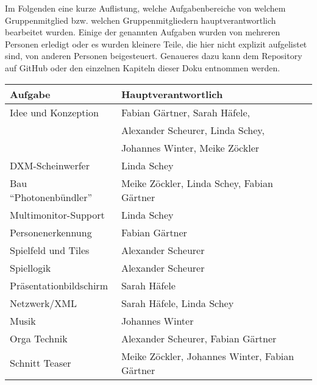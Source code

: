 
Im Folgenden eine kurze Auflistung, welche Aufgabenbereiche von welchem Gruppenmitglied bzw. welchen Gruppenmitgliedern hauptverantwortlich bearbeitet wurden. Einige der genannten Aufgaben wurden von mehreren Personen erledigt oder es wurden kleinere Teile, die hier nicht explizit aufgelistet sind, von anderen Personen beigesteuert. Genaueres dazu kann dem Repository auf GitHub oder den einzelnen Kapiteln dieser Doku entnommen werden.

\begin{center}
\begin{tabular}[hc]{|l|l|}
\hline
\textbf{Aufgabe} & \textbf{Hauptverantwortlich}\\
\hline
Idee und Konzeption& Fabian Gärtner, Sarah Häfele,\\
&Alexander Scheurer, Linda Schey,\\
&Johannes Winter, Meike Zöckler\\
DXM-Scheinwerfer&Linda Schey\\
Bau \enquote{Photonenbündler}&Meike Zöckler, Linda Schey, Fabian Gärtner\\
Multimonitor-Support& Linda Schey\\
Personenerkennung& Fabian Gärtner\\
Spielfeld und Tiles& Alexander Scheurer\\
Spiellogik& Alexander Scheurer\\
Präsentationbildschirm& Sarah Häfele\\
Netzwerk/XML& Sarah Häfele, Linda Schey\\
Musik&Johannes Winter\\
Orga Technik& Alexander Scheurer, Fabian Gärtner\\
Schnitt Teaser& Meike Zöckler, Johannes Winter, Fabian Gärtner\\
\hline
\end{tabular}
\end{center}
